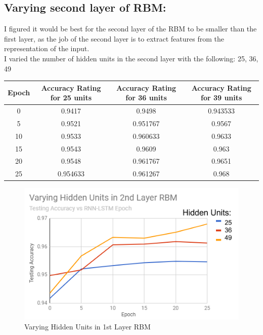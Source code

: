 \documentclass[a4paper]{article}
\begin{document}
\subsection{Varying second layer of RBM:}
\hspace*{10mm}
I figured it would be best for the second layer of the RBM to be smaller than the first layer, as the job of the second layer is to extract features from the representation of the input.\\
\hspace*{10mm}
I varied the number of hidden units in the second layer with the following: 25, 36, 49
\begin{center}
 \begin{tabular}{||c c c c||} 
 \hline
Epoch&
Accuracy Rating for 25 units&
Accuracy Rating for 36 units&
Accuracy Rating for 39 units\\[0.5ex]\hline\hline
0&
0.9417&
0.9498&
0.943533\\ 
 \hline
5&
0.9521&
0.951767&
0.9567\\ 
 \hline
10&
0.9533&
0.960633&
0.9633\\ 
 \hline
15&
0.9543&
0.9609&
0.963\\ 
 \hline
20&
0.9548&
0.961767&
0.9651\\ 
 \hline
25&
0.954633&
0.961267&
0.968\\ 
 \hline
\end{tabular}
\begin{figure}[h]
\centering
\includegraphics{varyRBM2nd}\caption{Varying Hidden Units in 1st Layer RBM}\label{fig:XSS}
\end{figure}
\end{center}
\pagebreak
\end{document}

